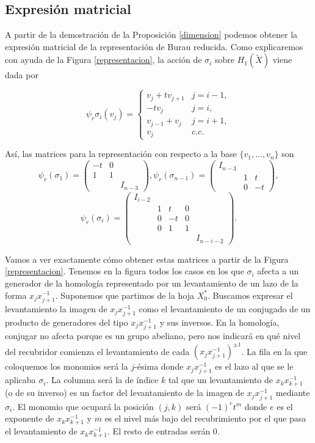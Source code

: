 \documentclass[TFG.tex]{subfiles}
\begin{document}
\subsection{Expresión matricial}
A partir de la demostración de la Proposición \ref{dimension} podemos obtener la expresión matricial de la representación de Burau reducida. Como explicaremos con ayuda de la Figura \ref{representacion}, la acción de $\sigma_i$ sobre $H_1(\widetilde{X})$ viene dada por

\[
\psi_r\sigma_i(v_j)=\begin{cases}
v_j+tv_{j+1} & j=i-1,\\
-tv_j & j=i,\\
v_{j-1}+v_j & j=i+1,\\
v_j & c.c.
\end{cases}
\]

Así, las matrices para la representación con respecto a la base $\{v_1,\dots, v_n\}$ son
\[
\psi_r(\sigma_1)=\begin{pmatrix}
-t & 0 & \\
1 & 1 & \\
& & I_{n-3}
\end{pmatrix}, \psi_r(\sigma_{n-1})=\begin{pmatrix}
I_{n-3} & &\\
& 1 & t \\
& 0 & -t 
\end{pmatrix},
\]
\[
\psi_r(\sigma_i )=\begin{pmatrix}
I_{i-2} & & &\\
& 1 & t & 0 & \\
& 0 & -t & 0 & \\
& 0 & 1 & 1 & \\
& & & & I_{n-i-2}  
\end{pmatrix}.
\]

Vamos a ver exactamente cómo obtener estas matrices a partir de la Figura \ref{representacion}. Tenemos en la figura todos los casos en los que $\sigma_i$ afecta a un generador de la homología representado por un levantamiento de un lazo de la forma $x_jx_{j+1}^{-1}$. Suponemos que partimos de la hoja $X^*_0$. Buscamos expresar el levantamiento la imagen de $x_jx_{j+1}^{-1}$ como el levantamiento de un conjugado de un producto de generadores del tipo $x_jx_{j+1}^{-1}$ y sus inversos. En la homología, conjugar no afecta porque es un grupo abeliano, pero nos indicará en qué nivel del recubridor comienza el levantamiento de cada $(x_jx_{j+1}^{-1})^{\pm 1}$. La fila en la que coloquemos los monomios será la $j$-ésima donde $x_jx_{j+1}^{-1}$ es el lazo al que se le aplicaba $\sigma_i$. La columna será la de índice $k$ tal que un levantamiento de $x_kx_{k+1}^{-1}$ (o de su inverso) es un factor del levantamiento de la imagen de $x_jx_{j+1}^{-1}$ mediante $\sigma_i$. El monomio que ocupará la posición $(j,k)$ será $(-1)^et^m$ donde $e$ es el exponente de $x_kx_{k+1}^{-1}$ y $m$ es el nivel más bajo del recubrimiento por el que pasa el levantamiento de $x_kx_{k+1}^{-1}$. El resto de entradas serán 0.
\end{document}
